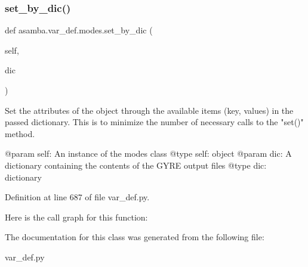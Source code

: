 \subsubsection{\texorpdfstring{set\+\_\+by\+\_\+dic()}{set\_by\_dic()}}
{\footnotesize\ttfamily def asamba.\+var\+\_\+def.\+modes.\+set\+\_\+by\+\_\+dic (\begin{DoxyParamCaption}\item[{}]{self,  }\item[{}]{dic }\end{DoxyParamCaption})}

\begin{DoxyVerb}Set the attributes of the object through the available items (key, values) in the passed 
dictionary. This is to minimize the number of necessary calls to the "set()" method.

@param self: An instance of the modes class
@type self: object
@param dic: A dictionary containing the contents of the GYRE output files
@type dic: dictionary
\end{DoxyVerb}
 

Definition at line 687 of file var\+\_\+def.\+py.

Here is the call graph for this function\+:


The documentation for this class was generated from the following file\+:\begin{DoxyCompactItemize}
\item 
var\+\_\+def.\+py\end{DoxyCompactItemize}
